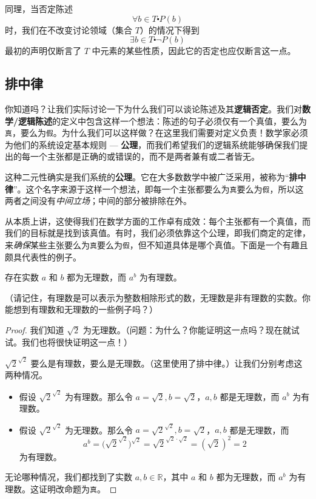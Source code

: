 同理，当否定陈述
\[\forall b \in T \centerdot P(b)\]
时，我们在不改变讨论领域（集合 $T$）的情况下得到
\[\exists b \in T \centerdot \neg P(b)\]
最初的声明仅断言了 $T$ 中元素的某些性质，因此它的否定也应仅断言这一点。

\subsection{排中律}

你知道吗？让我们实际讨论一下为什么我们可以谈论陈述及其\textbf{逻辑否定}。我们对\textbf{数学/逻辑陈述}的定义中包含这样一个想法：陈述的句子必须仅有一个真值，要么为\verb|真|，要么为\verb|假|。为什么我们可以这样做？在这里我们需要对定义负责！数学家必须为他们的系统设定基本规则 --- \textbf{公理}，而我们希望我们的逻辑系统能够确保我们提出的每一个主张都是正确的或错误的，而不是两者兼有或二者皆无。

这种二元性确实是我们系统的\textbf{公理}。它在大多数数学中被广泛采用，被称为``\textbf{排中律}''。这个名字来源于这样一个想法，即每一个主张都要么为\verb|真|要么为\verb|假|，所以这两者之间没有\emph{中间立场}；中间的部分被排除在外。

从本质上讲，这使得我们在数学方面的工作卓有成效：每个主张都有一个真值，而我们的目标就是找到该真值。有时，我们必须依靠这个公理，即我们商定的定律，来\emph{确保}某些主张要么为\verb|真|要么为\verb|假|，但不知道具体是哪个真值。下面是一个有趣且颇具代表性的例子。

\begin{proposition}
    存在实数 $a$ 和 $b$ 都为无理数，而 $a^b$ 为有理数。
\end{proposition}

（请记住，有理数是可以表示为整数相除形式的数，无理数是非有理数的实数。你能想到有理数和无理数的一些例子吗？）

\begin{proof}
    我们知道 $\sqrt{2}$ 为无理数。（问题：为什么？你能证明这一点吗？现在就试试。我们也将很快证明这一点！）

    $\sqrt{2}^{\sqrt{2}}$ 要么是有理数，要么是无理数。（这里使用了排中律。）让我们分别考虑这两种情况。
    \begin{itemize}
        \item 假设 $\sqrt{2}^{\sqrt{2}}$ 为有理数。那么令 $a=\sqrt{2}, b=\sqrt{2}$，$a, b$ 都是无理数，而 $a^b$ 为有理数。
        \item 假设 $\sqrt{2}^{\sqrt{2}}$ 为无理数。那么令 $a=\sqrt{2}^{\sqrt{2}}, b=\sqrt{2}$，$a, b$ 都是无理数，而
        \[a^b = \big(\sqrt{2}^{\sqrt{2}}\big)^{\sqrt{2}} = \sqrt{2}^{\sqrt{2} \cdot \sqrt{2}} = (\sqrt{2})^2 = 2\]
        为有理数。
    \end{itemize}
    无论哪种情况，我们都找到了实数 $a, b \in \mathbb{R}$，其中 $a$ 和 $b$ 都为无理数，而 $a^b$ 为有理数。这证明改命题为\verb|真|。
\end{proof}


